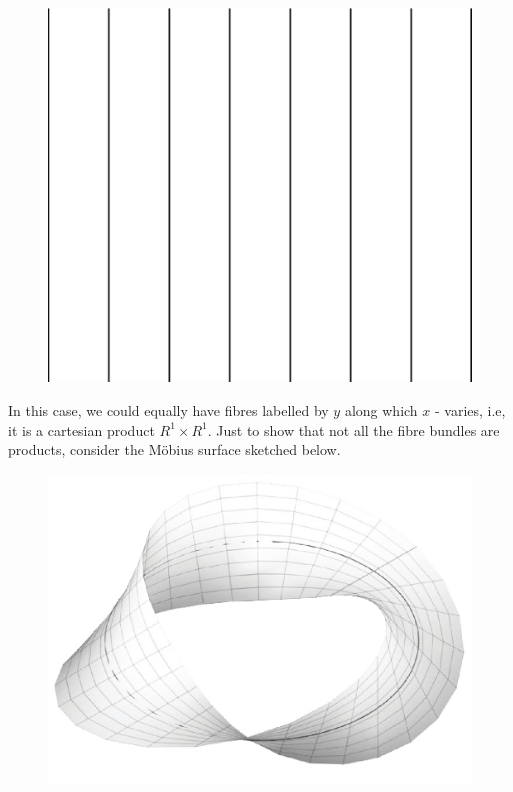\begin{figure}[H]
\centering
\includegraphics[scale=0.1]{src/images/chap26/16.jpg}
\end{figure}
\bigskip

In this case, we could equally have fibres labelled by $y$ along which $x$ - varies,
i.e, it is a cartesian product $R^1 \times R^1$. Just to show that not all the fibre bundles
are products, consider the M\"{o}bius surface sketched below.
\begin{figure}[H]
\centering
\includegraphics[scale=0.27]{src/images/chap26/17.jpg}
\end{figure}
\eject


